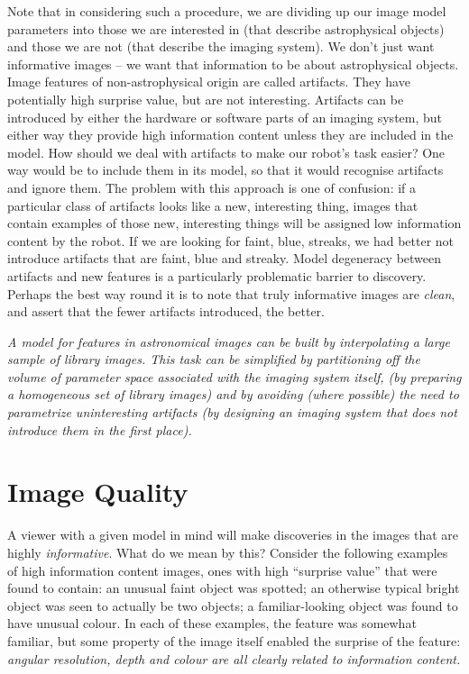 \documentclass[letterpaper, 11pt]{article}
\begin{document}
Note that in considering such a procedure, we are dividing up our image  model
parameters into those we are interested in (that describe astrophysical
objects) and those we are not (that describe the imaging system). We don't
just want informative images -- we want that information to be about 
astrophysical objects. Image features of non-astrophysical origin are called
artifacts. They  have potentially high surprise value, but are not
interesting. Artifacts can be introduced by either the hardware or software
parts of an imaging system, but either way they provide high information
content unless they are included in the model.  How should we deal with
artifacts to make our robot's task easier? One way would be to include them in
its model, so that it would recognise artifacts and ignore them. The problem
with this approach is one of confusion: if a particular class of artifacts
looks like a new, interesting thing, images that contain examples of those
new, interesting things will be assigned low information content by the robot.
If we are looking for faint, blue, streaks, we had better not
introduce artifacts that are faint, blue and streaky.
Model degeneracy between artifacts and new features is a particularly 
problematic barrier to discovery. Perhaps the best way round it is to  note
that truly informative images are {\it clean}, and assert that the 
fewer artifacts introduced, the better.

{\it A model for features in astronomical images can be built by interpolating
a large sample of library images. This task can be simplified by partitioning
off the volume of parameter space associated with the imaging system itself,
(by preparing a homogeneous set of library images) and by avoiding (where
possible) the need to parametrize uninteresting artifacts (by designing an
imaging system that does not introduce them in the first place).}



\section{Image Quality}

A viewer with a given model in mind will make discoveries in the images  that
are highly {\it informative}. What do we mean by this? Consider the following
examples of high information content images, ones with high ``surprise value''
that were found to contain:  an unusual faint object was spotted;  an
otherwise typical bright object was seen to actually be two objects; a
familiar-looking object was found to have unusual colour.  In each of these
examples, the feature was somewhat familiar, but some property of the image
itself enabled the surprise of the feature: \it{angular resolution, depth and
colour are all clearly related to information content}. 
\end{document}
